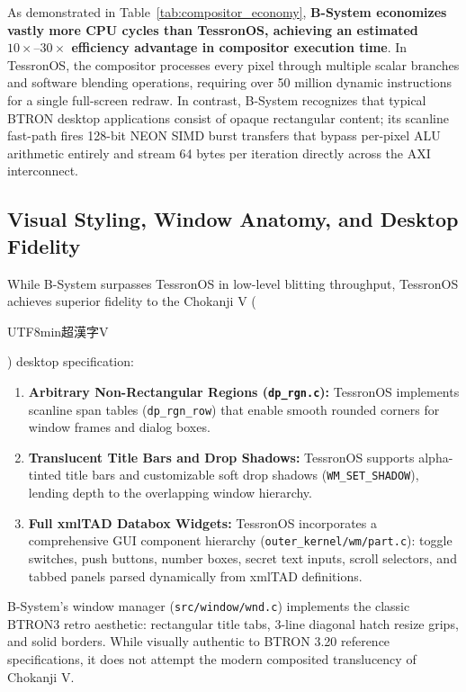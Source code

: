 \documentclass[10pt,journal,compsoc,twocolumn]{article}
\newcommand{\ja}[1]{\begin{CJK*}{UTF8}{min}#1\end{CJK*}}
\begin{document}
As demonstrated in Table~\ref{tab:compositor_economy}, \textbf{B-System economizes vastly more CPU cycles than TessronOS, achieving an estimated $10\times\text{--}30\times$ efficiency advantage in compositor execution time}. In TessronOS, the compositor processes every pixel through multiple scalar branches and software blending operations, requiring over 50 million dynamic instructions for a single full-screen redraw. In contrast, B-System recognizes that typical BTRON desktop applications consist of opaque rectangular content; its scanline fast-path fires 128-bit NEON SIMD burst transfers that bypass per-pixel ALU arithmetic entirely and stream 64 bytes per iteration directly across the AXI interconnect.

\subsection{Visual Styling, Window Anatomy, and Desktop Fidelity}

While B-System surpasses TessronOS in low-level blitting throughput, TessronOS achieves superior fidelity to the Chokanji V (\ja{超漢字V}) desktop specification:
\begin{enumerate}[leftmargin=*]
    \item \textbf{Arbitrary Non-Rectangular Regions (\texttt{dp\_rgn.c}):} TessronOS implements scanline span tables (\texttt{dp\_rgn\_row}) that enable smooth rounded corners for window frames and dialog boxes.
    \item \textbf{Translucent Title Bars and Drop Shadows:} TessronOS supports alpha-tinted title bars and customizable soft drop shadows (\texttt{WM\_SET\_SHADOW}), lending depth to the overlapping window hierarchy.
    \item \textbf{Full xmlTAD Databox Widgets:} TessronOS incorporates a comprehensive GUI component hierarchy (\texttt{outer\_kernel/wm/part.c}): toggle switches, push buttons, number boxes, secret text inputs, scroll selectors, and tabbed panels parsed dynamically from xmlTAD definitions.
\end{enumerate}

B-System's window manager (\texttt{src/window/wnd.c}) implements the classic BTRON3 retro aesthetic: rectangular title tabs, 3-line diagonal hatch resize grips, and solid borders. While visually authentic to BTRON 3.20 reference specifications, it does not attempt the modern composited translucency of Chokanji V.
\end{document}
